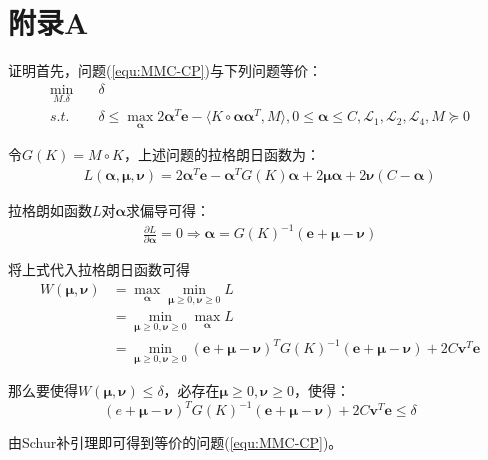 \chapter*{附录A}
{证明}\hspace{1em}首先，问题(\ref{equ:MMC-CP})与下列问题等价：
\begin{equation*}
\begin{split}
\min_{M.\delta} \quad & \delta \\
s.t. \quad & \delta \le \max_{\mathbf{\alpha}}2\mathbf{\alpha}^T\mathbf{e}-\langle K \circ \mathbf{\alpha}\mathbf{\alpha}^T,M \rangle,0 \le \mathbf{\alpha} \le C, \mathcal{L}_1,\mathcal{L}_2,\mathcal{L}_4,M \succeq 0
\end{split}
\end{equation*}

令$G(K)=M \circ K$，上述问题的拉格朗日函数为：
\begin{equation*}
\begin{split}
L(\mathbf{\alpha},\mathbf{\mu},\mathbf{\nu}) = 2\mathbf{\alpha}^T\mathbf{e} - \mathbf{\alpha}^TG(K)\mathbf{\alpha} + 2\mathbf{\mu}\mathbf{\alpha} + 2\mathbf{\nu}(C-\mathbf{\alpha})
\end{split}
\end{equation*}

拉格朗如函数$L$对$\mathbf{\alpha}$求偏导可得：
\begin{equation*}
\begin{split}
\frac{\partial L}{\partial\mathbf{\alpha}}=0 \Longrightarrow \mathbf{\alpha} = G(K)^{-1}(\mathbf{e} + \mathbf{\mu} - \mathbf{\nu}) 
\end{split}
\end{equation*}

将上式代入拉格朗日函数可得
\begin{equation*}
\begin{split}
W(\mathbf{\mu},\mathbf{\nu}) & = \max_{\mathbf{\alpha}}\min_{\mathbf{\mu}\ge 0,\mathbf{\nu}\ge 0}L \\
& = \min_{\mathbf{\mu}\ge 0,\mathbf{\nu}\ge 0}\max_{\mathbf{\alpha}} L \\
& = \min_{\mathbf{\mu}\ge 0,\mathbf{\nu}\ge 0}(\mathbf{e}+\mathbf{\mu}-\mathbf{\nu})^TG(K)^{-1}(\mathbf{e}+\mathbf{\mu}-\mathbf{\nu}) + 2C\mathbf{v}^T\mathbf{e}
\end{split}
\end{equation*}

那么要使得$W(\mathbf{\mu},\mathbf{\nu}) \le \delta$，必存在$\mathbf{\mu}\ge 0,\mathbf{\nu}\ge 0$，使得：
$$(e+\mathbf{\mu}-\mathbf{\nu})^TG(K)^{-1}(\mathbf{e}+\mathbf{\mu}-\mathbf{\nu}) + 2C\mathbf{v}^T\mathbf{e} \le \delta$$

由Schur补引理即可得到等价的问题(\ref{equ:MMC-CP})。
